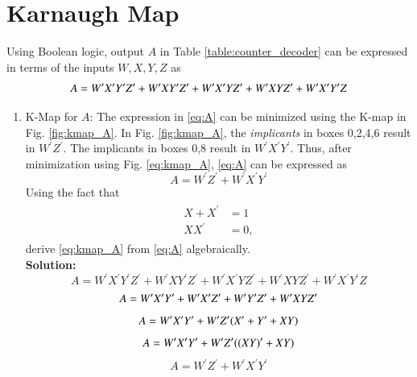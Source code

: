 \documentclass[journal,12pt,twocolumn]{IEEEtran}
\begin{document}
\section{Karnaugh Map}
Using Boolean logic, output $A$  in Table \ref{table:counter_decoder} can be expressed in terms of the inputs $W,X,Y,Z$ as
\begin{equation}
\label{eq:A}
A = W^{\prime}X^{\prime}Y^{\prime}Z^{\prime}+W^{\prime}XY^{\prime}Z^{\prime}\\
+W^{\prime}X^{\prime}YZ^{\prime}+W^{\prime}XYZ^{\prime}+W^{\prime}X^{\prime}Y^{\prime}Z
\end{equation}
\begin{enumerate}
\item K-Map for $A$: 
The expression in \eqref{eq:A}  can be minimized using the K-map in Fig. \ref{fig:kmap_A}.
In Fig. \ref{fig:kmap_A},  the {\em implicants} in boxes 0,2,4,6 result in $W^{\prime}Z^{\prime}$.  The implicants in
boxes 0,8 result in $W^{\prime}X^{\prime}Y^{\prime}$.  Thus, after minimization using Fig. \ref{eq:kmap_A},  \eqref{eq:A} can be expressed as
\begin{equation}
	\label{eq:kmap_A}
	A = W^{\prime}Z^{\prime}+W^{\prime}X^{\prime}Y^{\prime}
\end{equation}
%
Using the fact that
\begin{align}
	\label{eq:boolean}
	\begin{split}
		X+X^{\prime} &= 1
		\\
		XX^{\prime} &= 0,
	\end{split}
\end{align}
%
derive \eqref{eq:kmap_A} from \eqref{eq:A} algebraically.\\
\textbf{Solution: } 
\begin{equation}
	A = W^{\prime}X^{\prime}Y^{\prime}Z^{\prime}+W^{\prime}XY^{\prime}Z^{\prime}+W^{\prime}X^{\prime}YZ^{\prime}+W^{\prime}XYZ^{\prime}+W^{\prime}X^{\prime}Y^{\prime}Z 
\end{equation}
\begin{equation}
	A = W^{\prime}X^{\prime}Y^{\prime}+W^{\prime}X^{\prime}Z^{\prime}
	+W^{\prime}Y^{\prime}Z^{\prime}+W^{\prime}XYZ^{\prime}\\
\end{equation}
\begin{equation}
	A = W^{\prime}X^{\prime}Y^{\prime}+W^{\prime}Z^{\prime}(X^{\prime}+Y^{\prime}+XY)\\
\end{equation}
\begin{equation}
	A = W^{\prime}X^{\prime}Y^{\prime}+W^{\prime}Z^{\prime}((XY)^{\prime}+XY)\\
\end{equation}
\begin{equation}
		A = W^{\prime}Z^{\prime}+W^{\prime}X^{\prime}Y^{\prime}	
\end{equation}


\end{enumerate}
\end{document}
